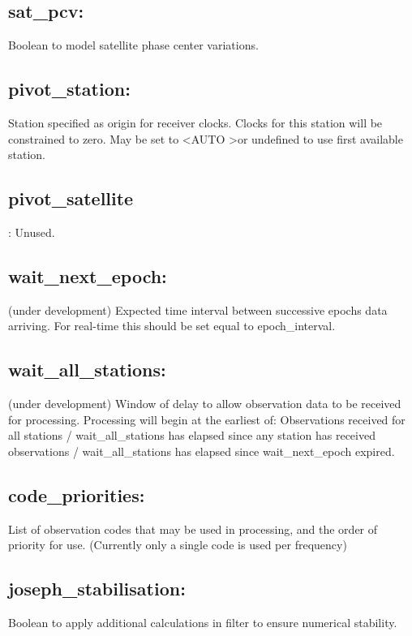 \subsection{sat\_pcv:}
Boolean to model satellite phase center variations.
\subsection{pivot\_station:}
Station specified as origin for receiver clocks. Clocks for this station will be constrained to zero. May be set to \textless AUTO \textgreater or undefined to use first available station.
\subsection{pivot\_satellite}:
Unused.
\subsection{wait\_next\_epoch:}
(under development)
Expected time interval between successive epochs data arriving. For real-time this should be set equal to epoch\_interval.
\subsection{wait\_all\_stations:}
(under development)
Window of delay to allow observation data to be received for processing.
Processing will begin at the earliest of: Observations received for all stations / wait\_all\_stations has elapsed since any station has received observations / wait\_all\_stations has elapsed since wait\_next\_epoch expired.

\subsection{code\_priorities:}
List of observation codes that may be used in processing, and the order of priority for use. (Currently only a single code is used per frequency)

\subsection{joseph\_stabilisation:}
Boolean to apply additional calculations in filter to ensure numerical stability.











